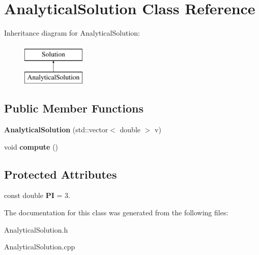 \hypertarget{class_analytical_solution}{}\section{Analytical\+Solution Class Reference}
\label{class_analytical_solution}
Inheritance diagram for Analytical\+Solution\+:\begin{figure}[H]
\begin{center}
\leavevmode
\includegraphics[height=2.000000cm]{class_analytical_solution}
\end{center}
\end{figure}
\subsection*{Public Member Functions}
\begin{DoxyCompactItemize}
\item 
\mbox{\label{class_analytical_solution_a9522a4a13b61dcc7f145e0fb39e5016d}} 
{\bfseries Analytical\+Solution} (std\+::vector$<$ double $>$ v)
\item 
\mbox{\label{class_analytical_solution_ae1ebc556a8dfed55b6c463625545d919}} 
void {\bfseries compute} ()
\end{DoxyCompactItemize}
\subsection*{Protected Attributes}
\begin{DoxyCompactItemize}
\item 
\mbox{\label{class_analytical_solution_a7790fe079a6319530e2d203c5ff64b23}} 
const double {\bfseries PI} = 3.
\end{DoxyCompactItemize}


The documentation for this class was generated from the following files\+:\begin{DoxyCompactItemize}
\item 
Analytical\+Solution.\+h\item 
Analytical\+Solution.\+cpp\end{DoxyCompactItemize}
